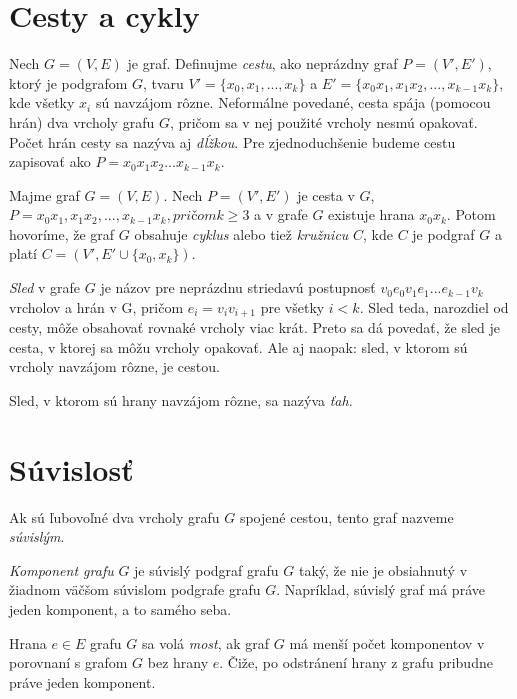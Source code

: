 \section{Cesty a cykly}

Nech $G = (V, E)$ je graf. Definujme \textit{cestu}, ako neprázdny graf $P = (V', E')$, ktorý je podgrafom $G$, tvaru $V' = \{x_{0}, x_{1}, ..., x_{k}\}$ a $E' = \{x_{0} x_{1}, x_{1} x_{2}, ..., x_{k-1} x_{k}\}$, kde všetky $x_{i}$ sú navzájom rôzne. Neformálne povedané, cesta spája (pomocou hrán) dva vrcholy grafu $G$, pričom sa v nej použité vrcholy nesmú opakovať. Počet hrán cesty sa nazýva aj \textit{dĺžkou}. Pre zjednoduchšenie budeme cestu zapisovať ako $P = x_{0} x_{1} x_{2} ... x_{k-1} x_{k}$.\newline

Majme graf $G = (V, E)$. Nech $P = (V', E')$ je cesta v $G$, $P = x_{0} x_{1}, x_{1} x_{2}, ..., x_{k-1} x_{k}, pričom k\geq 3$ a v grafe $G$ existuje hrana $x_{0}x_{k}$. Potom hovoríme, že graf $G$ obsahuje \textit{cyklus} alebo tiež \textit{kružnicu} $C$, kde $C$ je podgraf $G$ a platí $C = (V', E' \cup \{x_{0},x_{k}\})$. \newline

\textit{Sled} v grafe $G$ je názov pre neprázdnu striedavú postupnosť $v_{0}e_{0}v_{1}e_{1} ... e_{k-1}v_{k}$ vrcholov a hrán v G, pričom $e_{i} = v_{i}v_{i+1}$ pre všetky $i < k$. Sled teda, narozdiel od cesty, môže obsahovať rovnaké vrcholy viac krát. Preto sa dá povedať, že sled je cesta, v ktorej sa môžu vrcholy opakovať. Ale aj naopak: sled, v ktorom sú vrcholy navzájom rôzne, je cestou.\newline

Sled, v ktorom sú hrany navzájom rôzne, sa nazýva \textit{ťah}.\newline

\section{Súvislosť}

Ak sú ľubovoľné dva vrcholy grafu $G$ spojené cestou, tento graf nazveme \textit{súvislým}. \newline

\textit{Komponent grafu} $G$ je súvislý podgraf grafu $G$ taký, že nie je obsiahnutý v žiadnom väčšom súvislom podgrafe grafu $G$. Napríklad, súvislý graf má práve jeden komponent, a to samého seba.\newline

Hrana $e \in E$ grafu $G$ sa volá \textit{most}, ak graf $G$ má menší počet komponentov v porovnaní s grafom $G$ bez hrany $e$. Čiže, po odstránení hrany z grafu pribudne práve jeden komponent.\newline

